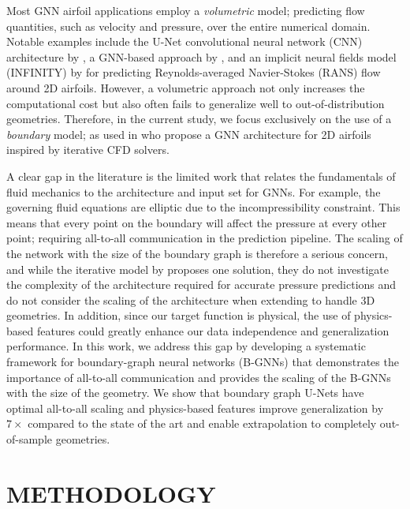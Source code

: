 \documentclass{marine_2025_paper_template}
\begin{document}
\noindent Most GNN airfoil applications employ a \textit{volumetric} model; predicting flow quantities, such as velocity and pressure, over the entire numerical domain. Notable examples include the U-Net convolutional neural network (CNN) architecture by \cite{thuerey2020}, a GNN-based approach by \cite{bonnet2023}, and an implicit neural fields model (INFINITY) by \cite{serrano2023} for predicting Reynolds-averaged Navier-Stokes (RANS) flow around 2D airfoils. However, a volumetric approach not only increases the computational cost but also often fails to generalize well to out-of-distribution geometries. Therefore, in the current study, we focus exclusively on the use of a \textit{boundary} model; as used in \cite{durasov2023} who propose a GNN architecture for 2D airfoils inspired by iterative CFD solvers.\newline

\noindent A clear gap in the literature is the limited work that relates the fundamentals of fluid mechanics to the architecture and input set for GNNs.
For example, the governing fluid equations are elliptic due to the incompressibility constraint. This means that every point on the boundary will affect the pressure at every other point; requiring all-to-all communication in the prediction pipeline. The scaling of the network with the size of the boundary graph is therefore a serious concern, and while the iterative model by \cite{durasov2023} proposes one solution, they do not investigate the complexity of the architecture required for accurate pressure predictions and do not consider the scaling of the architecture when extending to handle 3D geometries. In addition, since our target function is physical, the use of physics-based features \citep{weymouth2013} could greatly enhance our data independence and generalization performance. In this work, we address this gap by developing a systematic framework for boundary-graph neural networks (B-GNNs) that demonstrates the importance of all-to-all communication and provides the scaling of the B-GNNs with the size of the geometry. We show that boundary graph U-Nets have optimal all-to-all scaling and physics-based features improve generalization by $7\times$ compared to the state of the art and enable extrapolation to completely out-of-sample geometries.


\section{METHODOLOGY}
\end{document}
